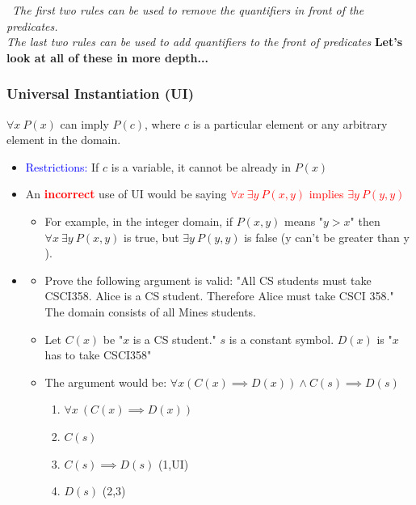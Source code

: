 \documentclass[12pt, letterpaper]{article}
\newcommand{\cul}[1]{%
		\uline{\phantom{#1}}%
		\llap{\contour{white}{#1}}%
	}
\begin{document}
\bigbreak
\faInfoCircle \ \emph{The first two rules can be used to remove the quantifiers in front of the predicates. \\ The last two rules can be used to add quantifiers to the front of predicates}
\bigbreak
\textbf{Let's look at all of these in more depth...}


\pagebreak
\subsubsection*{Universal Instantiation (UI)}
$\forall x \ P(x)$ can imply $P(c)$, where $c$ is a particular element or any arbitrary element in the domain. 
\begin{itemize}[label={}, leftmargin=0.3cm]
	\item \textcolor{blue}{Restrictions:} If $c$ is a variable, it cannot be already in $P(x)$
	\item An \textcolor{red}{\textbf{incorrect}} use of UI would be saying \textcolor{red}{$\forall x \ \exists y \ P(x,y)$ implies $\exists y \ P(y,y)$}
	\begin{itemize}[label={}]
		\item For example, in the integer domain, if $P(x,y)$ means "$ y > x $" then $\forall x \ \exists y \ P(x,y)$ is true, but $\exists y \ P(y,y)$ is false (y can't be greater than y \faSmileO).
	\end{itemize}
	\item \cul{Example}
	\begin{itemize}[label={}]
		\item Prove the following argument is valid: "All CS students must take CSCI358. Alice is a CS student. Therefore Alice must take CSCI 358." The domain consists of all Mines students.
		\item Let $C(x)$ be "$x$ is a CS student." $s$ is a constant symbol. $D(x)$ is "$x$ has to take CSCI358"
		\item The argument would be: $\forall x (C(x) \implies D(x)) \land C(s) \implies D(s)$
		{\small \begin{enumerate}
			\item $\forall x \ (C(x) \implies D(x))$
			\item $C(s)$
			\item $C(s) \implies D(s)$ (1,UI)
			\item $D(s)$ \hspace*{1.75cm} (2,3)
		\end{enumerate}
		}
	\end{itemize}
\end{itemize}
\end{document}
